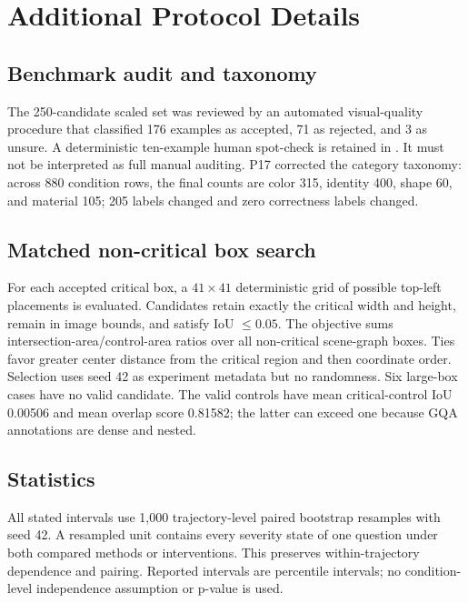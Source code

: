 \section{Additional Protocol Details}

\subsection{Benchmark audit and taxonomy}
The 250-candidate scaled set was reviewed by an automated visual-quality procedure that classified 176 examples as accepted, 71 as rejected, and 3 as unsure. A deterministic ten-example human spot-check is retained in . It must not be interpreted as full manual auditing. P17 corrected the category taxonomy: across 880 condition rows, the final counts are color 315, identity 400, shape 60, and material 105; 205 labels changed and zero correctness labels changed.

\subsection{Matched non-critical box search}
For each accepted critical box, a $41\times41$ deterministic grid of possible top-left placements is evaluated. Candidates retain exactly the critical width and height, remain in image bounds, and satisfy IoU $\le0.05$. The objective sums intersection-area/control-area ratios over all non-critical scene-graph boxes. Ties favor greater center distance from the critical region and then coordinate order. Selection uses seed 42 as experiment metadata but no randomness. Six large-box cases have no valid candidate. The valid controls have mean critical-control IoU 0.00506 and mean overlap score 0.81582; the latter can exceed one because GQA annotations are dense and nested.

\subsection{Statistics}
All stated intervals use 1,000 trajectory-level paired bootstrap resamples with seed 42. A resampled unit contains every severity state of one question under both compared methods or interventions. This preserves within-trajectory dependence and pairing. Reported intervals are percentile intervals; no condition-level independence assumption or p-value is used.
